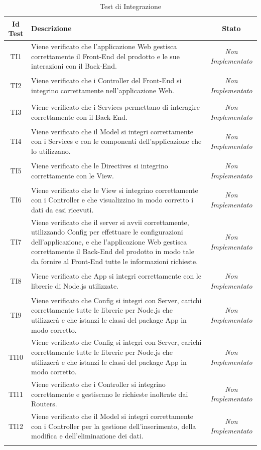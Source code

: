 \normalsize
\begin{longtable}[ht]{|c|>{}m{10cm}|c|}
\hline 
\textbf{Id Test} & \textbf{Descrizione} & \textbf{Stato}\\
\hline
\endhead
\hypertarget{TI1}{TI1} & Viene verificato che l’applicazione Web gestisca
correttamente il Front-End del prodotto e le sue interazioni
con il Back-End. & \textit{Non Implementato}\\ \hline
\hypertarget{TI2}{TI2} & Viene verificato che i Controller del Front-End si integrino
correttamente nell’applicazione Web. & \textit{Non Implementato}\\ \hline
\hypertarget{TI3}{TI3} & Viene verificato che i Services permettano di interagire
correttamente con il Back-End. & \textit{Non Implementato}\\ \hline
\hypertarget{TI4}{TI4} & Viene verificato che il Model si integri correttamente con i
Services e con le componenti dell’applicazione che lo
utilizzano. & \textit{Non Implementato}\\ \hline
\hypertarget{TI5}{TI5} & Viene verificato che le Directives si integrino correttamente
con le View. & \textit{Non Implementato}\\ \hline
\hypertarget{TI6}{TI6} & Viene verificato che le View si integrino correttamente con i
Controller e che visualizzino in modo corretto i dati da essi
ricevuti. & \textit{Non Implementato}\\ \hline
\hypertarget{TI7}{TI7} & Viene verificato che il server si avvii correttamente,
utilizzando Config per effettuare le configurazioni
dell’applicazione, e che l’applicazione Web gestisca
correttamente il Back-End del prodotto in modo tale da
fornire al Front-End tutte le informazioni richieste. & \textit{Non Implementato}\\ \hline
\hypertarget{TI8}{TI8} & Viene verificato che App si integri correttamente con le
librerie di Node.js utilizzate. & \textit{Non Implementato}\\ \hline
\hypertarget{TI9}{TI9} & Viene verificato che Config si integri con Server, carichi
correttamente tutte le librerie per Node.js che utilizzerà e
che istanzi le classi del package App in modo corretto. & \textit{Non Implementato}\\ \hline
\hypertarget{TI10}{TI10} & Viene verificato che Config si integri con Server, carichi
correttamente tutte le librerie per Node.js che utilizzerà e
che istanzi le classi del package App in modo corretto. & \textit{Non Implementato}\\ \hline
\hypertarget{TI11}{TI11} & Viene verificato che i Controller si integrino correttamente
e gestiscano le richieste inoltrate dai Routers. & \textit{Non Implementato}\\ \hline
\hypertarget{TI12}{TI12} & Viene verificato che il Model si integri correttamente con i
Controller per la gestione dell’inserimento, della modifica e
dell’eliminazione dei dati. & \textit{Non Implementato}\\ \hline
\caption[Test di Integrazione]{Test di Integrazione}
\label{tabella:test2}
\end{longtable}
\clearpage